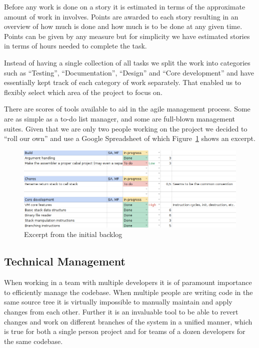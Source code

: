 Before any work is done on a story it is estimated in terms of the approximate
amount of work in involves. Points are awarded to each story resulting in an
overview of how much is done and how much is to be done at any given
time. Points can be given by any measure but for simplicity we have estimated
stories in terms of hours needed to complete the task.

Instead of having a single collection of all tasks we split the work into
categories such as ``Testing'', ``Documentation'', ``Design'' and ``Core
development'' and have essentially kept track of each category of work
separately. That enabled us to flexibly select which area of the project to
focus on.

There are scores of tools available to aid in the agile management process. Some
are as simple as a to-do list manager, and some are full-blown management
suites. Given that we are only two people working on the project we decided to
``roll our own'' and use a Google Spreadsheet of which
Figure~\ref{fig:project-mgm:backlog} shows an excerpt.

\begin{figure}[h]
  \centering

  \includegraphics[width=.9\textwidth]{./images/backlog}

  \caption{Excerpt from the initial backlog}
  \label{fig:project-mgm:backlog}
\end{figure}

\subsection{Technical Management}

When working in a team with multiple developers it is of paramount importance to
efficiently manage the codebase. When multiple people are writing code in the
same source tree it is virtually impossible to manually maintain and apply
changes from each other. Further it is an invaluable tool to be able to revert
changes and work on different branches of the system in a unified manner, which
is true for both a single person project and for teams of a dozen developers for
the same codebase.

